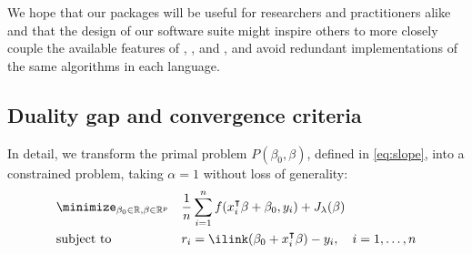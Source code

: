 \documentclass[article]{jss}
\begin{document}
We hope that our packages will be useful for researchers and practitioners
alike and that the design of our software suite might inspire others to more
closely couple the available features of , , and
, and avoid redundant implementations of the same algorithms in
each language.



\newpage

\begin{appendix}

  \section{Duality gap and convergence criteria}
  \label{sec:convergence-criteria-details}

  In detail, we transform the primal problem \(P(\beta_0,\beta)\), defined in \autoref{eq:slope}, into a
  constrained problem, taking \(\alpha = 1\) without loss of generality:
  \begin{equation}
    \begin{aligned}
       & \minimize_{\beta_0 \in \mathbb{R},\beta \in \mathbb{R}^p} &  & \frac{1}{n} \sum_{i=1}^n f(x_i^\intercal \beta + \beta_0, y_i) + J_{\lambda}(\beta) \\
       & \text{subject to}                                         &  & r_i = \ilink(\beta_0 + x_i^\intercal \beta) - y_i, \quad i = 1, \ldots, n           \\
    \end{aligned}
  \end{equation}


\end{appendix}
\end{document}
